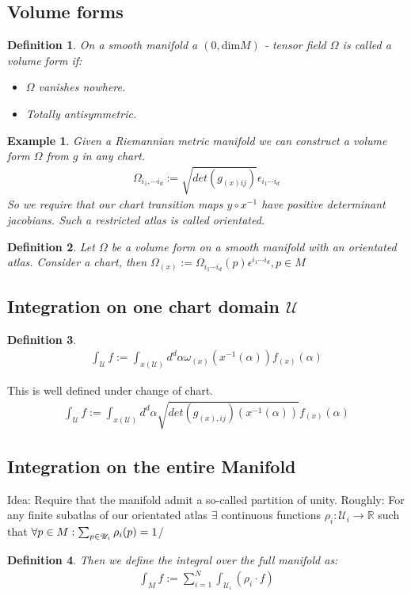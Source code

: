 \documentclass[10pt, oneside]{article}
\newcommand{\R}{\mathbb{R}}
\newtheorem{defn}{Definition}
\newtheorem{example}{Example}
\begin{document}
\subsection{Volume forms}
\begin{defn}
  On a smooth manifold a $(0,\text{dim} M)$ - tensor field $\Omega$ is called a volume form if:
  \begin{itemize}
  \item $\Omega$ vanishes nowhere.
  \item Totally antisymmetric.
  \end{itemize}
\end{defn}
\begin{example}
Given a Riemannian metric manifold we can construct a volume form $\Omega$ from $g$ in any chart.
\begin{align*}
  \Omega_{i_{1}, \cdots i_{d}} :=\sqrt{det(g_{(x)ij})} \epsilon_{i_{1} \cdots i_{d}}
\end{align*}
So we require that our chart transition maps $y \circ x^{-1}$ have positive determinant jacobians. Such a restricted atlas is called orientated.
\end{example}
\begin{defn}
Let $\Omega$ be a volume form on a smooth manifold with an orientated atlas. Consider a chart, then $\Omega_{(x)} := \Omega_{i_{1}\cdots i_{d} } (p) \epsilon^{i_{1}\cdots i_{d}}, p \in M$
\end{defn}
\subsection{Integration on one chart domain $\mathcal{U}$}
\begin{defn}
\begin{align*}
  \int_{\mathcal{U}} f := \int_{x(\mathcal{U})} d^d \alpha  \omega_{(x)}(x^{-1} (\alpha)) f_{(x)} (\alpha)
\end{align*}
\end{defn}
This is well defined under change of chart.
\begin{align*}
\int_{\mathcal{U}} f := \int_{x(\mathcal{U})} d^d \alpha \sqrt{ det(g_{(x),ij})(x^{-1} (\alpha))} f_{(x)} (\alpha)
\end{align*}
\subsection{Integration on the entire Manifold}
Idea: Require that the manifold admit a so-called partition of unity.
Roughly: For any finite subatlas of our orientated atlas $\exists$ continuous functions $\rho_i :\mathcal{U}_i \to \R$ such that $\\ \forall p \in M: \sum_{p \in \mathcal{U}_{i}} \rho_i (p) = 1$/
\begin{defn}
Then we define the integral over the full manifold as:
\begin{align*}
  \int_{M}f := \sum_{i=1}^{N} \int_{\mathcal{U}_{i}} (\rho_i \cdot f)
\end{align*}
\end{defn}
\end{document}
